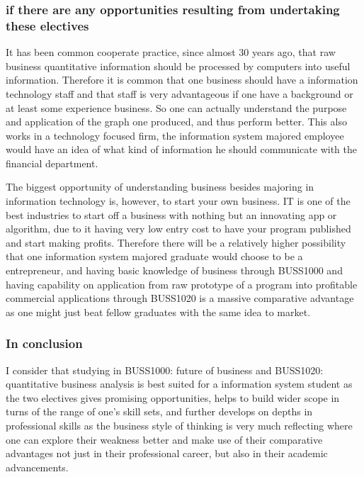 \documentclass[../draft.tex]{subfiles}
\begin{document}
\subsubsection{if there are any opportunities resulting from undertaking these electives}
It has been common cooperate practice, since almost 30 years ago, that raw business quantitative information should be processed by computers into useful information. Therefore it is common that one business should have a information technology staff and that staff is very advantageous if one have a background or at least some experience business. So one can actually understand the purpose and application of the graph one produced, and thus perform better. 
This also works in a technology focused firm, the information system majored employee would have an idea of what kind of information he should communicate with the financial department.\par
The biggest opportunity of understanding business besides majoring in information technology is, however, to start your own business. IT is one of the best industries to start off a business with nothing but an innovating app or algorithm, due to it having very low entry cost to have your program published and start making profits. Therefore there will be a relatively higher possibility that one information system majored graduate would choose to be a entrepreneur, and having basic knowledge of business through BUSS1000 and having capability on application from raw prototype of a program into profitable commercial applications through BUSS1020 is a massive comparative advantage as one might just beat fellow graduates with the same idea to market.\par
\subsubsection{In conclusion}
I consider that studying in BUSS1000: future of business and BUSS1020: quantitative business analysis is best suited for a information system student as the two electives gives promising opportunities, helps to build wider scope in turns of the range of one’s skill sets, and further develops on depths in professional skills as the business style of thinking is very much reflecting where one can explore their weakness better and make use of their comparative advantages not just in their professional career, but also in their academic advancements.\par
\end{document}
